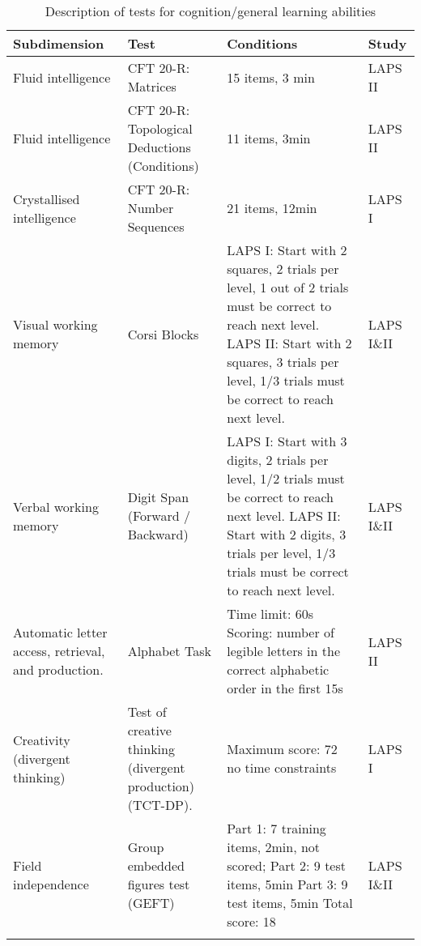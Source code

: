 \documentclass[output=paper]{langsci/langscibook}
\begin{document}
\begin{table}\footnotesize
\begin{tabularx}{\textwidth}{QQQl}
\lsptoprule
{Subdimension} & {Test} & {Conditions} & {Study}\\\midrule
Fluid intelligence & CFT 20-R: Matrices \citep{Weiss2006} & 15 items, 3 min & LAPS II\\
Fluid intelligence & CFT 20-R: Topological Deductions (Conditions) \citep{Weiss2006} & 11 items, 3min & LAPS II\\
Crystallised intelligence & CFT 20-R: Number Sequences \citep{Weiss2006} & 21 items, 12min & LAPS I\\
Visual working memory & Corsi Blocks & LAPS I: Start with 2 squares, 2 trials per level, 1 out of 2 trials must be correct to reach next level. LAPS II: Start with 2 squares, 3 trials per level, 1/3 trials must be correct to reach next level. & LAPS I\&II\\
Verbal working memory & Digit Span (Forward / Backward) & LAPS I: Start with 3 digits, 2 trials per level, 1/2 trials must be correct to reach next level. LAPS II: Start with 2 digits, 3 trials per level, 1/3 trials must be correct to reach next level. & LAPS I\&II\\
Automatic letter access, retrieval, and production. & Alphabet Task \citep{BerningerEtAl1992} & Time limit: 60s Scoring: number of legible letters in the correct alphabetic order in the first 15s & LAPS II\\
Creativity (divergent thinking) & Test of creative thinking (divergent production) (TCT-DP). \citep{UrbanJellen1995} & Maximum score: 72 no time constraints & LAPS I\\
Field independence & Group embedded figures test (GEFT) \citep{WitkinEtAl2014} & Part 1: 7 training items, 2min, not scored; Part 2: 9 test items, 5min Part 3: 9 test items, 5min
Total score: 18 & LAPS I\&II\\
\lspbottomrule
\end{tabularx}
\caption{Description of tests for cognition/general learning abilities}
\end{table}
\end{document}
